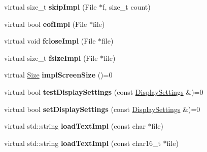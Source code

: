 \begin{DoxyCompactItemize}
\item 
\hypertarget{class_tempest_1_1_system_a_p_i_a14004506324e69505a14b1f8484ce662}{virtual size\+\_\+t {\bfseries skip\+Impl} (File $\ast$f, size\+\_\+t count)}\label{class_tempest_1_1_system_a_p_i_a14004506324e69505a14b1f8484ce662}

\item 
\hypertarget{class_tempest_1_1_system_a_p_i_a1973c02aa91ec35fd652cf2660dec297}{virtual bool {\bfseries eof\+Impl} (File $\ast$file)}\label{class_tempest_1_1_system_a_p_i_a1973c02aa91ec35fd652cf2660dec297}

\item 
\hypertarget{class_tempest_1_1_system_a_p_i_a324d1c193005221cb48e0107ac5ece2a}{virtual void {\bfseries fclose\+Impl} (File $\ast$file)}\label{class_tempest_1_1_system_a_p_i_a324d1c193005221cb48e0107ac5ece2a}

\item 
\hypertarget{class_tempest_1_1_system_a_p_i_affe959cb5f9af2b6ebb56041bf6ee037}{virtual size\+\_\+t {\bfseries fsize\+Impl} (File $\ast$file)}\label{class_tempest_1_1_system_a_p_i_affe959cb5f9af2b6ebb56041bf6ee037}

\item 
\hypertarget{class_tempest_1_1_system_a_p_i_a125204d3adef039def69677f8b521380}{virtual \hyperlink{struct_tempest_1_1_size}{Size} {\bfseries impl\+Screen\+Size} ()=0}\label{class_tempest_1_1_system_a_p_i_a125204d3adef039def69677f8b521380}

\item 
\hypertarget{class_tempest_1_1_system_a_p_i_a9643238b2f081cfa83b83098be71f35d}{virtual bool {\bfseries test\+Display\+Settings} (const \hyperlink{class_tempest_1_1_display_settings}{Display\+Settings} \&)=0}\label{class_tempest_1_1_system_a_p_i_a9643238b2f081cfa83b83098be71f35d}

\item 
\hypertarget{class_tempest_1_1_system_a_p_i_a23b249d25a81ecef85b3f4490ad5e61e}{virtual bool {\bfseries set\+Display\+Settings} (const \hyperlink{class_tempest_1_1_display_settings}{Display\+Settings} \&)=0}\label{class_tempest_1_1_system_a_p_i_a23b249d25a81ecef85b3f4490ad5e61e}

\item 
\hypertarget{class_tempest_1_1_system_a_p_i_ab3bbfd0bff242ae5fdec9bf59340315f}{virtual std\+::string {\bfseries load\+Text\+Impl} (const char $\ast$file)}\label{class_tempest_1_1_system_a_p_i_ab3bbfd0bff242ae5fdec9bf59340315f}

\item 
\hypertarget{class_tempest_1_1_system_a_p_i_aa935046fb883ac63e50e08a71746431a}{virtual std\+::string {\bfseries load\+Text\+Impl} (const char16\+\_\+t $\ast$file)}\label{class_tempest_1_1_system_a_p_i_aa935046fb883ac63e50e08a71746431a}


\end{DoxyCompactItemize}
